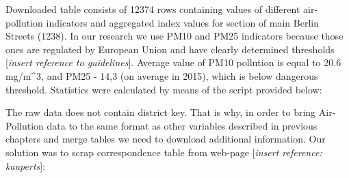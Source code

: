 \documentclass[]{article}
\newenvironment{Shaded}{\begin{snugshade}}{\end{snugshade}}
\newcommand{\KeywordTok}[1]{\textcolor[rgb]{0.13,0.29,0.53}{\textbf{#1}}}
\newcommand{\DataTypeTok}[1]{\textcolor[rgb]{0.13,0.29,0.53}{#1}}
\newcommand{\StringTok}[1]{\textcolor[rgb]{0.31,0.60,0.02}{#1}}
\newcommand{\CommentTok}[1]{\textcolor[rgb]{0.56,0.35,0.01}{\textit{#1}}}
\newcommand{\OperatorTok}[1]{\textcolor[rgb]{0.81,0.36,0.00}{\textbf{#1}}}
\newcommand{\NormalTok}[1]{#1}
\begin{document}
Downloaded table consists of 12374 rows containing values of different
air-pollution indicators and aggregated index values for section of main
Berlin Streets (1238). In our research we use PM10 and PM25 indicators
because those ones are regulated by European Union and have clearly
determined thresholds {[}\emph{insert reference to guidelines}{]}.
Average value of PM10 pollution is equal to 20.6 mg/m\^{}3, and PM25 -
14,3 (on average in 2015), which is below dangerous threshold.
Statistics were calculated by means of the script provided below:

\begin{Shaded}
\end{Shaded}

The raw data does not contain district key. That is why, in order to
bring Air-Pollution data to the same format as other variables described
in previous chapters and merge tables we need to download additional
information. Our solution was to scrap correspondence table from
web-page {[}\emph{insert reference: kauperts}{]}:
\end{document}
